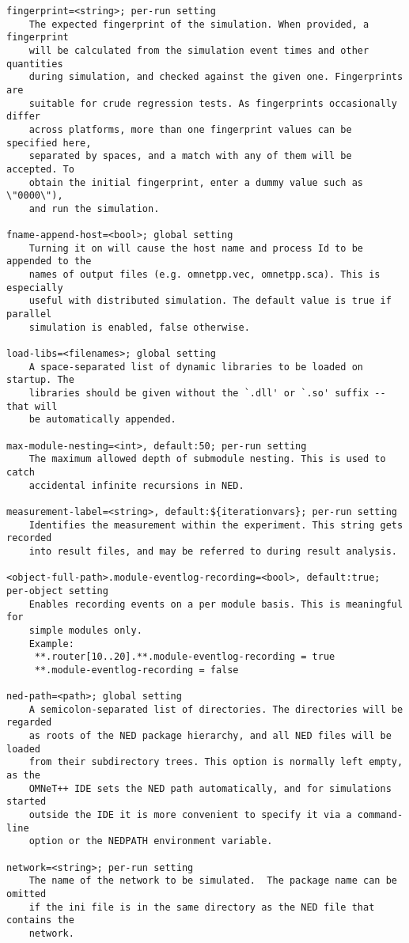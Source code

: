 \begin{verbatim}
fingerprint=<string>; per-run setting
    The expected fingerprint of the simulation. When provided, a fingerprint
    will be calculated from the simulation event times and other quantities
    during simulation, and checked against the given one. Fingerprints are
    suitable for crude regression tests. As fingerprints occasionally differ
    across platforms, more than one fingerprint values can be specified here,
    separated by spaces, and a match with any of them will be accepted. To
    obtain the initial fingerprint, enter a dummy value such as \"0000\"), 
    and run the simulation.

fname-append-host=<bool>; global setting
    Turning it on will cause the host name and process Id to be appended to the
    names of output files (e.g. omnetpp.vec, omnetpp.sca). This is especially
    useful with distributed simulation. The default value is true if parallel
    simulation is enabled, false otherwise.

load-libs=<filenames>; global setting
    A space-separated list of dynamic libraries to be loaded on startup. The
    libraries should be given without the `.dll' or `.so' suffix -- that will
    be automatically appended.

max-module-nesting=<int>, default:50; per-run setting
    The maximum allowed depth of submodule nesting. This is used to catch
    accidental infinite recursions in NED.

measurement-label=<string>, default:${iterationvars}; per-run setting
    Identifies the measurement within the experiment. This string gets recorded
    into result files, and may be referred to during result analysis.

<object-full-path>.module-eventlog-recording=<bool>, default:true; per-object setting
    Enables recording events on a per module basis. This is meaningful for
    simple modules only.
    Example:
     **.router[10..20].**.module-eventlog-recording = true
     **.module-eventlog-recording = false

ned-path=<path>; global setting
    A semicolon-separated list of directories. The directories will be regarded
    as roots of the NED package hierarchy, and all NED files will be loaded
    from their subdirectory trees. This option is normally left empty, as the
    OMNeT++ IDE sets the NED path automatically, and for simulations started
    outside the IDE it is more convenient to specify it via a command-line
    option or the NEDPATH environment variable.

network=<string>; per-run setting
    The name of the network to be simulated.  The package name can be omitted
    if the ini file is in the same directory as the NED file that contains the
    network.


\end{verbatim}
